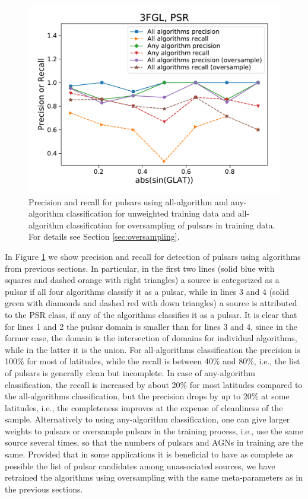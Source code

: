 \begin{figure}[h]
\includegraphics[width=\twopicsp\textwidth]{plots/all_algs_3FGL_precision_recall_oversample_PSR.pdf}
\caption{Precision and recall for pulsars using all-algorithm and any-algorithm classification for unweighted training data and
all-algorithm classification for oversampling of pulsars in training data. For details see Section \ref{sec:oversampling}.}
\label{fig:prec_recall}
\end{figure}


In Figure \ref{fig:prec_recall} we show precision and recall for detection of pulsars using algorithms from previous sections.
In particular, in the first two lines (solid blue with squares and dashed orange with right triangles) a source is categorized as a pulsar if all four algorithms classify it as a pulsar,
while in lines 3 and 4 (solid green with diamonds and dashed red with down triangles) a source is attributed to the PSR class, if any of the algorithms classifies it as a pulsar.
It is clear that for lines 1 and 2 the pulsar domain is smaller than for lines 3 and 4, since in the former case, the domain is the intersection of domains for individual algorithms, while in the latter it is the union.
For all-algorithms classification the precision is 100\% for most of latitudes, while the recall is between 40\% and 80\%, i.e., the list of pulsars is generally clean but incomplete.
In case of any-algorithm classification, the recall is increased by about 20\% for most latitudes compared to the all-algorithms classification, but the precision drops by up to 20\% at some latitudes, i.e., the completeness improves at the expense of cleanliness of the sample.
Alternatively to using any-algorithm classification, one can give larger weights to pulsars or oversample pulsars in the training process, i.e., use the same source several times, so that the numbers of pulsars and AGNs in training are the same.
Provided that in some applications it is beneficial to have as complete as possible the list of pulsar candidates among unassociated sources, we have retrained the algorithms using oversampling with the same meta-parameters as in the previous sections.

